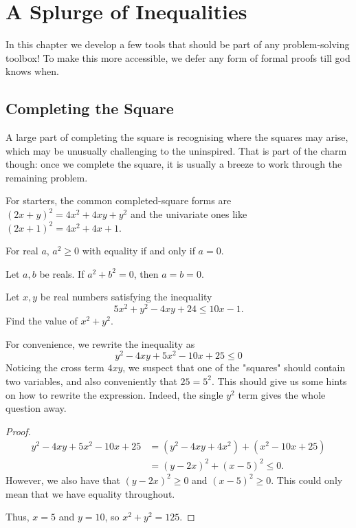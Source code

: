 \documentclass[../jarvis.tex]{subfiles}
\begin{document}
\section{A Splurge of Inequalities}
In this chapter we develop a few tools that should be part of any problem-solving toolbox! To make this more accessible, we defer any form of formal proofs till god knows when.

\subsection{Completing the Square}
A large part of completing the square is recognising where the squares may arise, which may be unusually challenging to the uninspired. That is part of the charm though: once we complete the square, it is usually a breeze to work through the remaining problem. 

For starters, the common completed-square forms are $(2x+y)^2=4x^2+4xy+y^2$ and the univariate ones like $(2x+1)^2=4x^2+4x+1$.

\begin{proposition}
    For real $a$, $a^2 \geq 0$ with equality if and only if $a=0$.
\end{proposition}
\begin{proposition}
    Let $a,b$ be reals. If $a^2+b^2=0$, then $a=b=0$.
\end{proposition}

\begin{example}[2013 SMO(J) P18]
    Let $x,y$ be real numbers satisfying the inequality
    $$5x^2+y^2-4xy+24\leq 10x-1.$$ Find the value of $x^2+y^2$.
\end{example}
For convenience, we rewrite the inequality as
$$y^2-4xy+5x^2-10x+25\leq 0$$
Noticing the cross term $4xy$, we suspect that one of the "squares" should contain two variables, and also conveniently that $25=5^2$. This should give us some hints on how to rewrite the expression. Indeed, the single $y^2$ term gives the whole question away.
\begin{proof}
    \begin{align*}
        y^2-4xy+5x^2-10x+25&= (y^2-4xy+4x^2)+(x^2-10x+25) \\
        &=(y-2x)^2+(x-5)^2 \leq 0.
    \end{align*}
    However, we also have that $(y-2x)^2\geq 0$ and $(x-5)^2\geq 0$. This could only mean that we have equality throughout.

    Thus, $x=5$ and $y=10$, so $x^2+y^2=\boxed{125}$.
\end{proof}
\end{document}
